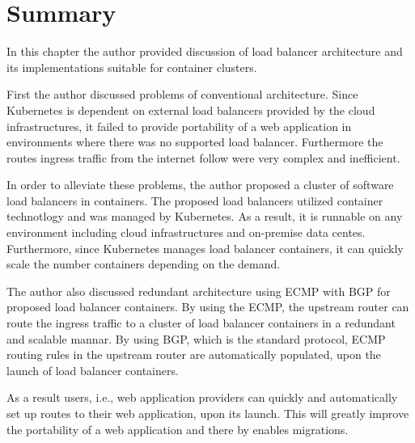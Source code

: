 \FloatBarrier



\section{Summary}
In this chapter the author provided discussion of load balancer architecture and its implementations suitable for container clusters.

First the author discussed problems of conventional architecture. 
Since Kubernetes is dependent on external load balancers provided by the cloud infrastructures, 
it failed to provide portability of a web application in environments where there was no supported load balancer. 
Furthermore the routes ingress traffic from the internet follow were very complex and inefficient.

In order to alleviate these problems, the author proposed a cluster of software load balancers in containers.
The proposed load balancers utilized container technotlogy and was managed by Kubernetes.
As a result, it is runnable on any environment including cloud infrastructures and on-premise data centes.
Furthermore, since Kubernetes manages load balancer containers, it can quickly scale the number containers depending on the demand.

The author also discussed redundant architecture using ECMP with BGP for proposed load balancer containers.
By using the ECMP, the upstream router can route the ingress traffic to a cluster of load balancer containers in a redundant and scalable mannar.
By using BGP, which is the standard protocol, ECMP routing rules in the upstream router are automatically populated, upon the launch of load balancer containers.

As a result users, i.e., web application providers can quickly and automatically set up routes to their web application, upon its launch.
This will greatly improve the portability of a web application and there by enables migrations.


